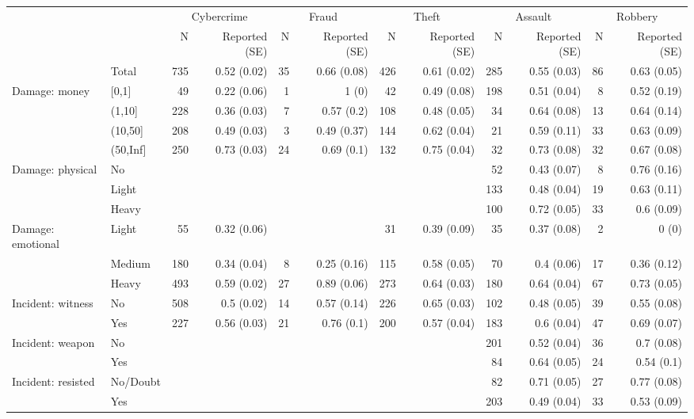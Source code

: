 \begin{tabular}{llrrrrrrrrrr}
	\toprule
	&  & \multicolumn{2}{c}{Cybercrime    } & \multicolumn{2}{c}{Fraud    } & \multicolumn{2}{c}{Theft    } & \multicolumn{2}{c}{Assault    } & \multicolumn{2}{c}{Robbery    } \\ 
	\cmidrule(lr){3-4} \cmidrule(lr){5-6} \cmidrule(lr){7-8} \cmidrule(lr){9-10} \cmidrule(lr){11-12}
	&     & N & Reported (SE) & N  & Reported (SE)  & N   & Reported (SE)   & N    & Reported (SE)    & N     & Reported (SE)     \\ 
	\midrule\addlinespace[2.5pt]
		& Total & 735 & 0.52 (0.02) & 35 & 0.66 (0.08) & 426 & 0.61 (0.02) & 285 & 0.55 (0.03) & 86 & 0.63 (0.05) \\ 
	\midrule
	Damage: money & [0,1] & 49 & 0.22 (0.06) & 1 & 1 (0) & 42 & 0.49 (0.08) & 198 & 0.51 (0.04) & 8 & 0.52 (0.19) \\ 
	& (1,10] & 228 & 0.36 (0.03) & 7 & 0.57 (0.2) & 108 & 0.48 (0.05) & 34 & 0.64 (0.08) & 13 & 0.64 (0.14) \\ 
	& (10,50] & 208 & 0.49 (0.03) & 3 & 0.49 (0.37) & 144 & 0.62 (0.04) & 21 & 0.59 (0.11) & 33 & 0.63 (0.09) \\ 
	& (50,Inf] & 250 & 0.73 (0.03) & 24 & 0.69 (0.1) & 132 & 0.75 (0.04) & 32 & 0.73 (0.08) & 32 & 0.67 (0.08) \\ 
	\midrule
	Damage: physical & No & &  & &  & &  & 52 & 0.43 (0.07) & 8 & 0.76 (0.16) \\ 
	& Light & &  & &  & &  & 133 & 0.48 (0.04) & 19 & 0.63 (0.11) \\ 
	& Heavy & &  & &  & &  & 100 & 0.72 (0.05) & 33 & 0.6 (0.09) \\ 
	\midrule
	Damage: emotional & Light & 55 & 0.32 (0.06) & &  & 31 & 0.39 (0.09) & 35 & 0.37 (0.08) & 2 & 0 (0) \\ 
	& Medium & 180 & 0.34 (0.04) & 8 & 0.25 (0.16) & 115 & 0.58 (0.05) & 70 & 0.4 (0.06) & 17 & 0.36 (0.12) \\ 
	& Heavy & 493 & 0.59 (0.02) & 27 & 0.89 (0.06) & 273 & 0.64 (0.03) & 180 & 0.64 (0.04) & 67 & 0.73 (0.05) \\ 
	\midrule
	Incident: witness & No & 508 & 0.5 (0.02) & 14 & 0.57 (0.14) & 226 & 0.65 (0.03) & 102 & 0.48 (0.05) & 39 & 0.55 (0.08) \\ 
	& Yes & 227 & 0.56 (0.03) & 21 & 0.76 (0.1) & 200 & 0.57 (0.04) & 183 & 0.6 (0.04) & 47 & 0.69 (0.07) \\ 
	\midrule
	Incident: weapon & No & &  & &  & &  & 201 & 0.52 (0.04) & 36 & 0.7 (0.08) \\ 
	& Yes & &  & &  & &  & 84 & 0.64 (0.05) & 24 & 0.54 (0.1) \\ 
	\midrule
	Incident: resisted & No/Doubt & &  & &  & &  & 82 & 0.71 (0.05) & 27 & 0.77 (0.08) \\ 
	& Yes & &  & &  & &  & 203 & 0.49 (0.04) & 33 & 0.53 (0.09) \\ 
	\bottomrule
\end{tabular}
